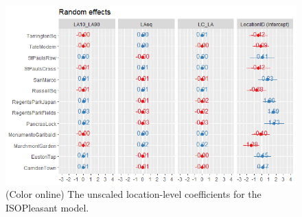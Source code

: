 \documentclass[
  authoryear,
  preprint,
  3p,
  onecolumn]{elsarticle}
\begin{document}
\begin{figure}

{\centering \includegraphics{Figure7.jpg}

}

\caption{\label{fig-unsclRandom}(Color online) The unscaled
location-level coefficients for the ISOPleasant model.}

\end{figure}


\renewcommand\refname{References}
  
\end{document}
